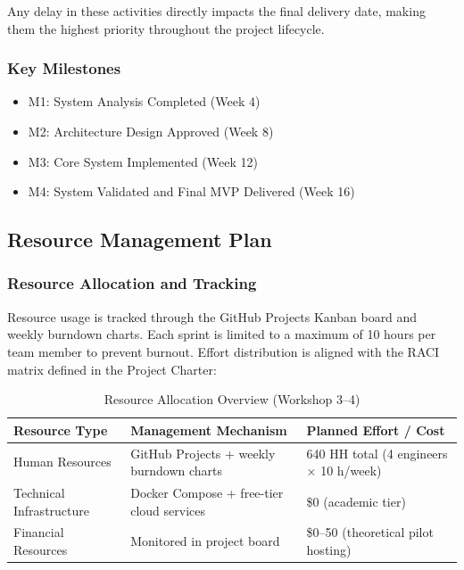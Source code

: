 \documentclass[9pt,conference]{IEEEtran}
\begin{document}
Any delay in these activities directly impacts the final delivery date, making them the highest priority throughout the project lifecycle.

\subsubsection{Key Milestones}

\begin{itemize}
    \item M1: System Analysis Completed (Week 4)
    \item M2: Architecture Design Approved (Week 8)
    \item M3: Core System Implemented (Week 12)
    \item M4: System Validated and Final MVP Delivered (Week 16)
\end{itemize}

\subsection{Resource Management Plan}

\subsubsection{Resource Allocation and Tracking}

Resource usage is tracked through the GitHub Projects Kanban board and weekly burndown charts. Each sprint is limited to a maximum of 10 hours per team member to prevent burnout. Effort distribution is aligned with the RACI matrix defined in the Project Charter:

\begin{table}[h]
\centering
\small
\caption{Resource Allocation Overview (Workshop 3–4)}
\label{tab:resource-allocation}
\begin{tabular}{@{}p{1.5cm}p{2.5cm}p{3.5cm}@{}}
\toprule
\textbf{Resource Type} & \textbf{Management Mechanism} & \textbf{Planned Effort / Cost} \\
\midrule
Human Resources & GitHub Projects + weekly burndown charts & 640 HH total (4 engineers × 10 h/week) \\
Technical Infrastructure & Docker Compose + free-tier cloud services & \$0 (academic tier) \\
Financial Resources & Monitored in project board & \$0--50 (theoretical pilot hosting) \\
\bottomrule
\end{tabular}
\end{table}
\end{document}
